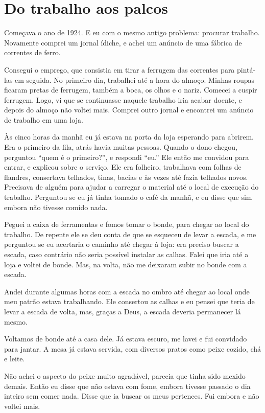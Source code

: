 \chapter{Do trabalho aos palcos}

Começava o ano de 1924. E eu com o mesmo antigo problema: procurar
trabalho. Novamente comprei um jornal ídiche, e achei um anúncio de uma
fábrica de correntes de ferro.

Consegui o emprego, que consistia em tirar a ferrugem das
correntes para pintá-las em seguida. No primeiro dia, trabalhei até a hora
do almoço. Minhas roupas ficaram pretas de ferrugem, também a boca,
os olhos e o nariz. Comecei a cuspir ferrugem. Logo, vi que se
continuasse naquele trabalho iria acabar doente, e depois do
almoço não voltei mais. Comprei outro jornal e encontrei um anúncio de trabalho em uma loja.

Às cinco horas da manhã eu já estava na porta da loja esperando para abrirem. Era o primeiro da fila, atrás havia muitas pessoas. Quando o dono chegou, perguntou ``quem é o primeiro?'', e respondi ``eu.'' Ele então me
convidou para entrar, e explicou sobre o serviço. Ele era folheiro, trabalhava com folhas de flandres, consertava
telhados, tinas, bacias e às vezes até fazia telhados novos. Precisava de
alguém para ajudar a carregar o material até o local de execução do trabalho. Perguntou se eu já tinha tomado o café da manhã, e eu disse que sim embora não tivesse comido nada.

Peguei a caixa de ferramentas e fomos tomar o bonde, para chegar ao 
local do trabalho. De repente ele se deu conta de que se esqueceu 
de levar a escada, e me perguntou se eu acertaria o caminho até 
chegar à loja: era preciso buscar a escada, caso contrário não 
seria possível instalar as calhas. Falei que iria até a loja e 
voltei de bonde. Mas, na volta, não me deixaram subir no bonde com a escada.

Andei durante algumas horas com a escada no ombro até chegar ao local
onde meu patrão estava trabalhando. Ele consertou as calhas e eu pensei
que teria de levar a escada de volta, mas, graças a Deus, a escada deveria
permanecer lá mesmo.

Voltamos de bonde até a casa dele. Já estava escuro, me lavei e fui
convidado para jantar. A mesa já estava servida, com diversos
pratos como peixe cozido, chá e leite.

Não achei o aspecto do peixe muito agradável, parecia que tinha sido 
mexido demais. Então eu disse que não estava com fome, embora tivesse
passado o dia inteiro sem comer nada. Disse que ia buscar os meus
pertences. Fui embora e não voltei mais.


